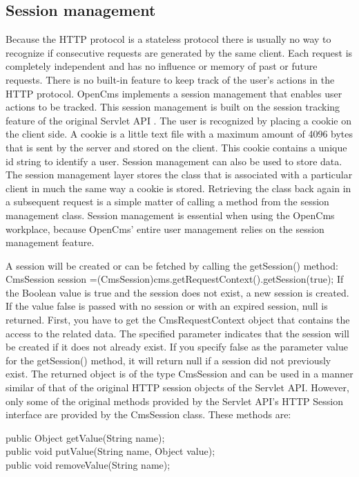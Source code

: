 \subsection{Session management}
Because the HTTP protocol is a stateless protocol there is usually no
way to recognize if consecutive requests are generated by the same
client. Each request is completely independent and has no influence or
memory of past or future requests. There is no built-in feature to keep
track of the user's actions in the HTTP protocol. OpenCms implements a
session management that enables user actions to be tracked. This
session management is built on the session tracking feature of the
original Servlet API . The user is recognized by placing a cookie on
the client side.  A cookie is  a little text file with a maximum amount
of 4096 bytes that is sent by the server and stored on the client. This
cookie contains a unique id string to identify a user. Session
management can also be used to store data. The session management layer
stores the class that is associated with a particular client in much
the same way a cookie is stored. Retrieving the class back again in a
subsequent request is a simple matter of calling a method from the
session management class.
Session management is essential when using the OpenCms workplace,
because OpenCms' entire user management relies on the session
management feature.

A session will be created or can be fetched by calling the {\meth getSession()}
method: {\meth CmsSession session =(CmsSession)cms.getRequestContext().getSession(true);}
If  the Boolean value is true and the session does not exist, a new
session is created. If the value false is passed with no session or
with an expired session, null is returned.
First, you have to get the CmsRequestContext object that contains the
access  to the related data. The specified parameter indicates that the
session will be created if it does not already exist. If you specify
false as the parameter value for the {\meth getSession()} method, it will
return null if a session did not previously exist. The returned object
is of the type {\class CmsSession} and can be used in a manner similar of that
of the original HTTP session objects of the Servlet API. However, only
some of the original methods provided by the Servlet API's HTTP Session
interface are provided by the {\class CmsSession} class. These methods are:

\begin{java}
public Object getValue(String name);\\
public void putValue(String name, Object value);\\
public void removeValue(String name);\\
\end{java}

